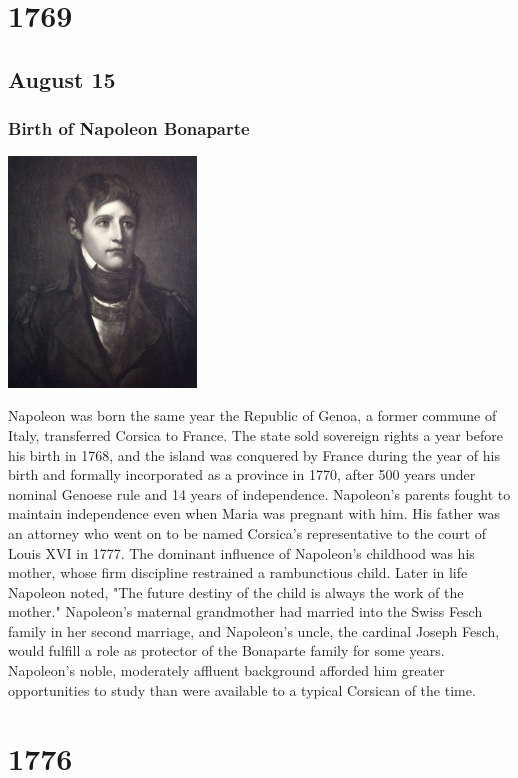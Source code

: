 \documentclass[11pt]{report}
\begin{document}
\chapter{1769}
\section{August 15}
\subsection{Birth of Napoleon Bonaparte}
\vspace{2mm}\begin{center}\includegraphics[width=5cm]{./img/youngBonaparte.jpg}\end{center}
Napoleon was born the same year the Republic of Genoa, a former commune of Italy, transferred Corsica to France. The state sold sovereign rights a year before his birth in 1768, and the island was conquered by France during the year of his birth and formally incorporated as a province in 1770, after 500 years under nominal Genoese rule and 14 years of independence. Napoleon's parents fought to maintain independence even when Maria was pregnant with him. His father was an attorney who went on to be named Corsica's representative to the court of Louis XVI in 1777. The dominant influence of Napoleon's childhood was his mother, whose firm discipline restrained a rambunctious child.
Later in life Napoleon noted, "The future destiny of the child is always the work of the mother." Napoleon's maternal grandmother had married into the Swiss Fesch family in her second marriage, and Napoleon's uncle, the cardinal Joseph Fesch, would fulfill a role as protector of the Bonaparte family for some years. Napoleon's noble, moderately affluent background afforded him greater opportunities to study than were available to a typical Corsican of the time.

\chapter{1776}
\end{document}
